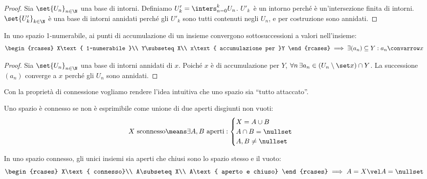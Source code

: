 \begin{proof}
	Sia $\set{U_n}_{n\in\N}$ una base di intorni.
	Definiamo $U'_k=\inters_{n=0}^kU_n$.
	$U'_k$~è un intorno perché è un'intersezione finita di intorni.
	$\set{U'_k}_{k\in\N}$ è una base di intorni annidati perché gli $U'_k$ sono tutti contenuti negli $U_n$, e per costruzione sono annidati.
\end{proof}

\begin{prop}
	\label{th:1numaccsucc}
	In uno spazio 1-numerabile, ai punti di accumulazione di un insieme convergono sottosuccessioni a valori nell'insieme:
	\[\begin{rcases}
		X\text{ 1-numerabile }\\
		Y\subseteq X\\
		x\text{ accumulazione per }Y
	\end{rcases}\implies
	\exists(a_n)\subseteq Y:a_n\convarrow x\]
\end{prop}

\begin{proof}
	Sia $\set{U_n}_{n\in\N}$ una base di intorni annidati di $x$.
	Poiché $x$ è di accumulazione per $Y$,
	$\forall n\,\exists a_n\in(U_n\setminus\set x)\cap Y$.
	La successione $(a_n)$ converge a $x$ perché gli $U_n$ sono annidati.
\end{proof}


Con la proprietà di connessione vogliamo rendere l'idea intuitiva che uno spazio sia ``tutto attaccato''.

\begin{defn}[Connessione]
	Uno spazio è connesso se non è esprimibile come unione di due aperti disgiunti non vuoti:
	\[X\text{ sconnesso}\means
	\exists A,B\text{ aperti}:
	\begin{cases}
		X=A\cup B\\
		A\cap B=\nullset\\
		A,B\neq\nullset
	\end{cases}\]
\end{defn}

\begin{prop}
	In uno spazio connesso, gli unici insiemi sia aperti che chiusi sono lo spazio stesso e il vuoto:
	\[\begin{rcases}
		X\text{ connesso}\\
		A\subseteq X\\
		A\text{ aperto e chiuso}
	\end{rcases}\implies A=X\vel A=\nullset\]
\end{prop}

